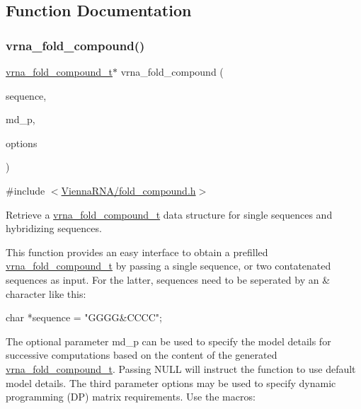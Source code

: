 \subsection{Function Documentation}
\mbox{\label{group__fold__compound_ga6601d994ba32b11511b36f68b08403be}} 
\subsubsection{\texorpdfstring{vrna\+\_\+fold\+\_\+compound()}{vrna\_fold\_compound()}}
{\footnotesize\ttfamily \mbox{\hyperlink{group__fold__compound_ga1b0cef17fd40466cef5968eaeeff6166}{vrna\+\_\+fold\+\_\+compound\+\_\+t}}$\ast$ vrna\+\_\+fold\+\_\+compound (\begin{DoxyParamCaption}\item[{const char $\ast$}]{sequence,  }\item[{\mbox{\hyperlink{group__model__details_ga1f8a10e12a0a1915f2a4eff0b28ea17c}{vrna\+\_\+md\+\_\+t}} $\ast$}]{md\+\_\+p,  }\item[{unsigned int}]{options }\end{DoxyParamCaption})}



{\ttfamily \#include $<$\mbox{\hyperlink{fold__compound_8h}{Vienna\+R\+N\+A/fold\+\_\+compound.\+h}}$>$}



Retrieve a \mbox{\hyperlink{group__fold__compound_ga1b0cef17fd40466cef5968eaeeff6166}{vrna\+\_\+fold\+\_\+compound\+\_\+t}} data structure for single sequences and hybridizing sequences. 

This function provides an easy interface to obtain a prefilled \mbox{\hyperlink{group__fold__compound_ga1b0cef17fd40466cef5968eaeeff6166}{vrna\+\_\+fold\+\_\+compound\+\_\+t}} by passing a single sequence, or two contatenated sequences as input. For the latter, sequences need to be seperated by an \textquotesingle{}\&\textquotesingle{} character like this\+:\begin{DoxyVerb}char *sequence = "GGGG&CCCC"; \end{DoxyVerb}


The optional parameter {\ttfamily md\+\_\+p} can be used to specify the model details for successive computations based on the content of the generated \mbox{\hyperlink{group__fold__compound_ga1b0cef17fd40466cef5968eaeeff6166}{vrna\+\_\+fold\+\_\+compound\+\_\+t}}. Passing N\+U\+LL will instruct the function to use default model details. The third parameter {\ttfamily options} may be used to specify dynamic programming (DP) matrix requirements. Use the macros\+:


